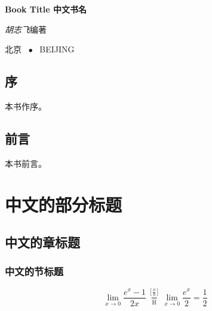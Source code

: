 \documentclass[a4paper,twoside]{ctexbook}
\begin{document}
\begin{titlepage}
  \centering
  \vspace*{25ex}
  { \textbf{Book Title 中文书名} \par}
  \vspace{10ex}
  { \textit{胡志飞}\quad{}编著 \par}
  \vfill
  {北京 ~$\bullet$ ~BEIJING}
\end{titlepage}
\thispagestyle{empty}


\frontmatter


\dominitoc
{}


\chapter*{序}

本书作序。


\chapter*{前言}

本书前言。


{
  \hypersetup{hidelinks}
  \tableofcontents
}


{
  \hypersetup{hidelinks}
  \lstlistoflistings
}


\mainmatter


\part{中文的部分标题}

\chapter{中文的章标题}

{
  \hypersetup{hidelinks}
  \minitoc
}

\vspace{10ex}

\lipsum[3]

\section{中文的节标题}

\lipsum[3-5]

\begin{equation}
  \label{eq:1}
   \lim_{x\to 0}{\frac{e^x-1}{2x}}
   \overset{\left[\frac{0}{0}\right]}{\underset{\mathrm{H}}{=}}
   \lim_{x\to 0}{\frac{e^x}{2}}={\frac{1}{2}}
\end{equation}
\end{document}
